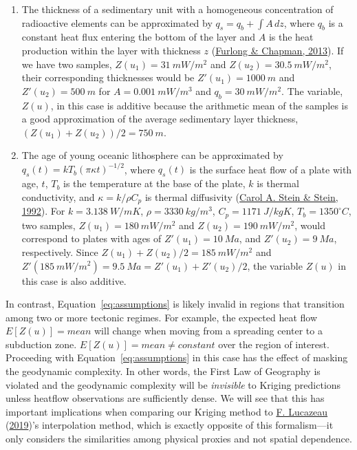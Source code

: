 \documentclass[draft,linenumbers]{agujournal2018}
\begin{document}
\begin{enumerate}
\def\labelenumi{\arabic{enumi}.}
\item
  The thickness of a sedimentary unit with a homogeneous concentration
  of radioactive elements can be approximated by
  \(q_s = q_b + \int A \,dz\), where \(q_b\) is a constant heat flux
  entering the bottom of the layer and \(A\) is the heat production
  within the layer with thickness \(z\)
  (\protect\hyperlink{ref-furlong2013}{Furlong \& Chapman, 2013}). If we
  have two samples, \(Z(u_1) = 31~mW/m^2\) and \(Z(u_2) = 30.5~mW/m^2\),
  their corresponding thicknesses would be \(Z'(u_1) = 1000~m\) and
  \(Z'(u_2) = 500~m\) for \(A = 0.001~mW/m^3\) and \(q_b = 30~mW/m^2\).
  The variable, \(Z(u)\), in this case is additive because the
  arithmetic mean of the samples is a good approximation of the average
  sedimentary layer thickness, \((Z(u_1) + Z(u_2)) / 2 = 750~m\).
\item
  The age of young oceanic lithosphere can be approximated by
  \(q_s(t) = kT_b(\pi\kappa t)^{-1/2}\), where \(q_s(t)\) is the surface
  heat flow of a plate with age, \(t\), \(T_b\) is the temperature at
  the base of the plate, \(k\) is thermal conductivity, and
  \(\kappa = k/\rho C_p\) is thermal diffusivity
  (\protect\hyperlink{ref-stein1992}{Carol A. Stein \& Stein, 1992}).
  For \(k = 3.138~W/mK\), \(\rho = 3330~kg/m^3\), \(C_p = 1171~J/kgK\),
  \(T_b = 1350^{\circ}C\), two samples, \(Z(u_1) = 180~mW/m^2\) and
  \(Z(u_2) = 190~mW/m^2\), would correspond to plates with ages of
  \(Z'(u_1) = 10~Ma\), and \(Z'(u_2) = 9~Ma\), respectively. Since
  \(Z(u_1) + Z(u_2) / 2 = 185~mW/m^2\) and
  \(Z'(185~mW/m^2) = 9.5~Ma = Z'(u_1) + Z'(u_2) / 2\), the variable
  \(Z(u)\) in this case is also additive.
\end{enumerate}

In contrast, Equation~\ref{eq:assumptions} is likely invalid in regions
that transition among two or more tectonic regimes. For example, the
expected heat flow \(E[Z(u)] = mean\) will change when moving from a
spreading center to a subduction zone. \(E[Z(u)] = mean \neq constant\)
over the region of interest. Proceeding with
Equation~\ref{eq:assumptions} in this case has the effect of masking the
geodynamic complexity. In other words, the First Law of Geography is
violated and the geodynamic complexity will be \emph{invisible} to
Kriging predictions unless heatflow observations are sufficiently dense.
We will see that this has important implications when comparing our
Kriging method to \protect\hyperlink{ref-lucazeau2019}{F. Lucazeau}
(\protect\hyperlink{ref-lucazeau2019}{2019})'s interpolation method,
which is exactly opposite of this formalism---it only considers the
similarities among physical proxies and not spatial dependence.
\end{document}
